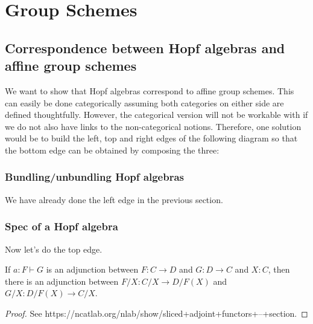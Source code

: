 \section{Group Schemes}


\subsection{Correspondence between Hopf algebras and affine group schemes}


We want to show that Hopf algebras correspond to affine group schemes.
This can easily be done categorically assuming both categories on either side are defined thoughtfully.
However, the categorical version will not be workable with if we do not also have links to the non-categorical notions.
Therefore, one solution would be to build the left, top and right edges of the following
diagram so that the bottom edge can be obtained by composing the three:


\subsubsection{Bundling/unbundling Hopf algebras}


We have already done the left edge in the previous section.


\subsubsection{Spec of a Hopf algebra}


Now let's do the top edge.


\begin{proposition}
  \label{0-slice-adj}
  \uses{}

  If $a : F \vdash G$ is an adjunction between $F : C \to D$ and $G : D \to C$ and $X : C$, then there is an adjunction between $F / X : C / X \to D / F(X)$ and $G / X : D / F(X) \to C / X$.
\end{proposition}
\begin{proof}
  \uses{}

  See https://ncatlab.org/nlab/show/sliced+adjoint+functors+--+section.
\end{proof}


